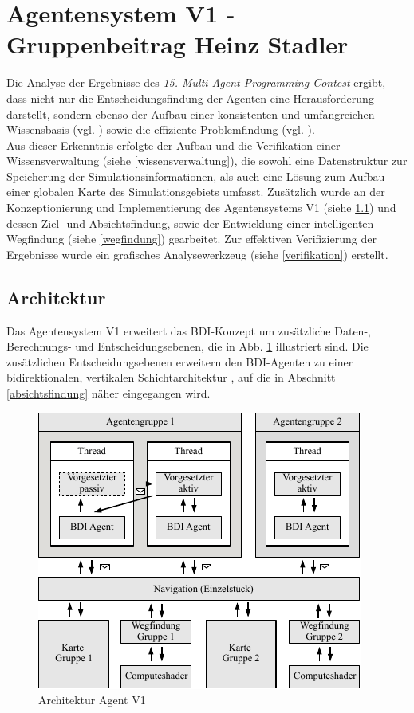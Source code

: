 \documentclass[runningheads]{llncs}
\begin{document}
	
	\section{Agentensystem V1 - Gruppenbeitrag Heinz Stadler}\label{agentV1}
	Die Analyse der Ergebnisse des \textit{15. Multi-Agent Programming Contest} \cite{Ahlbrecht2021} ergibt, dass nicht nur die Entscheidungsfindung der Agenten eine Herausforderung darstellt, sondern ebenso der Aufbau einer konsistenten und umfangreichen Wissensbasis (vgl. \cite[S. 29]{AhlbrechtFitBut2021}) sowie die effiziente Problemfindung (vgl. \cite[S. 17]{Ahlbrecht2021}). \\
	Aus dieser Erkenntnis erfolgte der Aufbau und die Verifikation einer Wissensverwaltung (siehe \ref{wissensverwaltung}), die sowohl eine Datenstruktur zur Speicherung der Simulationsinformationen, als auch eine Lösung zum Aufbau einer globalen Karte des Simulationsgebiets umfasst. Zusätzlich wurde an der Konzeptionierung und Implementierung des Agentensystems V1 (siehe \ref{archAgentV1}) und dessen Ziel- und Absichtsfindung, sowie der Entwicklung einer intelligenten Wegfindung (siehe \ref{wegfindung}) gearbeitet. Zur effektiven Verifizierung der Ergebnisse wurde ein grafisches Analysewerkzeug (siehe \ref{verifikation}) erstellt.
	
	\subsection{Architektur}\label{archAgentV1}
	Das Agentensystem V1 erweitert das BDI-Konzept \cite{Bratman1987} um zusätzliche Daten-, Berechnungs- und Entscheidungsebenen, die in Abb. \ref{g3:architecture} illustriert sind. Die zusätzlichen Entscheidungsebenen erweitern den BDI-Agenten zu einer bidirektionalen, vertikalen Schichtarchitektur \cite[S. 61-62]{Weiss2000}, auf die in Abschnitt \ref{absichtsfindung} näher eingegangen wird.
	
	
	\begin{figure}
		\vspace{-8mm}
		\includegraphics[scale=0.7]{./Referenzen/Architekturdiagramm.pdf}
		\caption{Architektur Agent V1}
		\label{g3:architecture}
		
	\end{figure}
	
\end{document}
